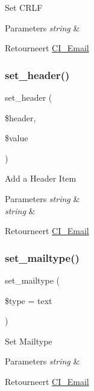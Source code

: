 Set C\+R\+LF


\begin{DoxyParams}{Parameters}
{\em string} & \\
\hline
\end{DoxyParams}
\begin{DoxyReturn}{Retourneert}
\mbox{\hyperlink{class_c_i___email}{C\+I\+\_\+\+Email}} 
\end{DoxyReturn}
\mbox{\label{class_c_i___email_aff40701d50f18c87942be79f8b447247}} 
\subsubsection{\texorpdfstring{set\_header()}{set\_header()}}
{\footnotesize\ttfamily set\+\_\+header (\begin{DoxyParamCaption}\item[{}]{\$header,  }\item[{}]{\$value }\end{DoxyParamCaption})}

Add a Header Item


\begin{DoxyParams}{Parameters}
{\em string} & \\
\hline
{\em string} & \\
\hline
\end{DoxyParams}
\begin{DoxyReturn}{Retourneert}
\mbox{\hyperlink{class_c_i___email}{C\+I\+\_\+\+Email}} 
\end{DoxyReturn}
\mbox{\label{class_c_i___email_a9baeadff990ea673d75c3019c8cc3524}} 
\subsubsection{\texorpdfstring{set\_mailtype()}{set\_mailtype()}}
{\footnotesize\ttfamily set\+\_\+mailtype (\begin{DoxyParamCaption}\item[{}]{\$type = {\ttfamily \textquotesingle{}text\textquotesingle{}} }\end{DoxyParamCaption})}

Set Mailtype


\begin{DoxyParams}{Parameters}
{\em string} & \\
\hline
\end{DoxyParams}
\begin{DoxyReturn}{Retourneert}
\mbox{\hyperlink{class_c_i___email}{C\+I\+\_\+\+Email}} 
\end{DoxyReturn}
\mbox{\label{class_c_i___email_a095be9606f6f063ee6e1af81b53d405e}} 
